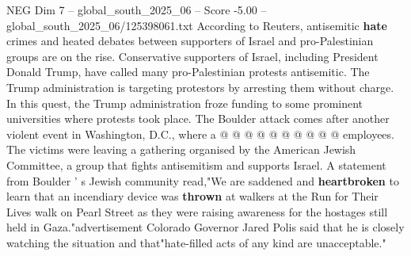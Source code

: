 \begin{textsample}{NEG Dim 7 – global\_south\_2025\_06 – Score -5.00 – global\_south\_2025\_06/125398061.txt}
According to Reuters, antisemitic \textbf{hate} crimes and heated debates between supporters of Israel and pro-Palestinian groups are on the rise.
Conservative supporters of Israel, including President Donald Trump, have called many pro-Palestinian protests antisemitic.
The Trump administration is targeting protestors by arresting them without charge.
In this quest, the Trump administration froze funding to some prominent universities where protests took place.
The Boulder attack comes after another violent event in Washington, D.C., where a @ @ @ @ @ @ @ @ @ @ employees.
The victims were leaving a gathering organised by the American Jewish Committee, a group that fights antisemitism and supports Israel.
A statement from Boulder ' s Jewish community read,"We are saddened and \textbf{heartbroken} to learn that an incendiary device was \textbf{thrown} at walkers at the Run for Their Lives walk on Pearl Street as they were raising awareness for the hostages still held in Gaza."advertisement Colorado Governor Jared Polis said that he is closely watching the situation and that"hate-filled acts of any kind are unacceptable."

\end{textsample}
